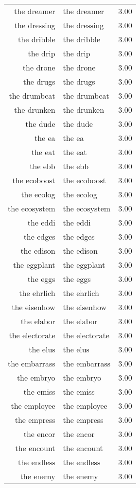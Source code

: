 \begin{table}[ht]
\begin{tabular}{rlr}
  the dreamer & the dreamer & 3.00 \\ 
  the dressing & the dressing & 3.00 \\ 
  the dribble & the dribble & 3.00 \\ 
  the drip & the drip & 3.00 \\ 
  the drone & the drone & 3.00 \\ 
  the drugs & the drugs & 3.00 \\ 
  the drumbeat & the drumbeat & 3.00 \\ 
  the drunken & the drunken & 3.00 \\ 
  the dude & the dude & 3.00 \\ 
  the ea & the ea & 3.00 \\ 
  the eat & the eat & 3.00 \\ 
  the ebb & the ebb & 3.00 \\ 
  the ecoboost & the ecoboost & 3.00 \\ 
  the ecolog & the ecolog & 3.00 \\ 
  the ecosystem & the ecosystem & 3.00 \\ 
  the eddi & the eddi & 3.00 \\ 
  the edges & the edges & 3.00 \\ 
  the edison & the edison & 3.00 \\ 
  the eggplant & the eggplant & 3.00 \\ 
  the eggs & the eggs & 3.00 \\ 
  the ehrlich & the ehrlich & 3.00 \\ 
  the eisenhow & the eisenhow & 3.00 \\ 
  the elabor & the elabor & 3.00 \\ 
  the electorate & the electorate & 3.00 \\ 
  the elus & the elus & 3.00 \\ 
  the embarrass & the embarrass & 3.00 \\ 
  the embryo & the embryo & 3.00 \\ 
  the emiss & the emiss & 3.00 \\ 
  the employee & the employee & 3.00 \\ 
  the empress & the empress & 3.00 \\ 
  the encor & the encor & 3.00 \\ 
  the encount & the encount & 3.00 \\ 
  the endless & the endless & 3.00 \\ 
  the enemy & the enemy & 3.00 \\ 

\end{tabular}
\end{table}
